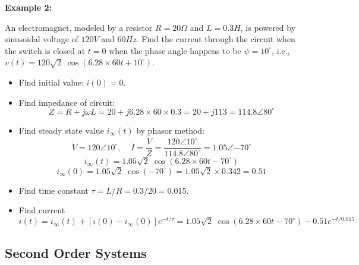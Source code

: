 
{\bf Example 2:}

An electromagnet, modeled by a resistor $R=20\Omega$ and $L=0.3H$,
is powered by sinusoidal voltage of $120V$ and $60Hz$. Find the current
through the circuit when the switch is closed at $t=0$ when the phase
angle happens to be $\psi=10^\circ$, i.e., $v(t)=120\sqrt{2}\;
\cos(6.28\times 60 t+10^\circ)$.

\begin{itemize}
\item Find initial value: $i(0)=0$. 
\item Find impedance of circuit:
\[ Z=R+j\omega L=20+j6.28\times 60 \times 0.3=20+j113=114.8\angle{80^\circ}	\]
\item Find steady state value $i_\infty(t)$ by phasor method:
\[
\dot{V}=120 \angle{10^\circ},\;\;\;\;\dot{I}=\frac{\dot{V}}{Z}
=\frac{120\angle{10^\circ}}{114.8\angle{80^\circ}}
=1.05\angle{-70^\circ}	\]
\[ i_\infty(t)=1.05\sqrt{2}\;\cos(6.28\times 60 t -70^\circ) \]
\[ i_\infty(0)=1.05\sqrt{2}\;\cos(-70^\circ)
=1.05\sqrt{2}\times 0.342=0.51	\]
\item Find time constant $\tau=L/R=0.3/20=0.015$.
\item Find current
\[	i(t)=i_{\infty}(t)+[i(0)-i_{\infty}(0)]e^{-t/\tau}
      =1.05\sqrt{2}\;\cos(6.28\times 60 t -70^\circ)-0.51 e^{-t/0.015}	\]

\end{itemize}




\subsection*{Second Order Systems}


